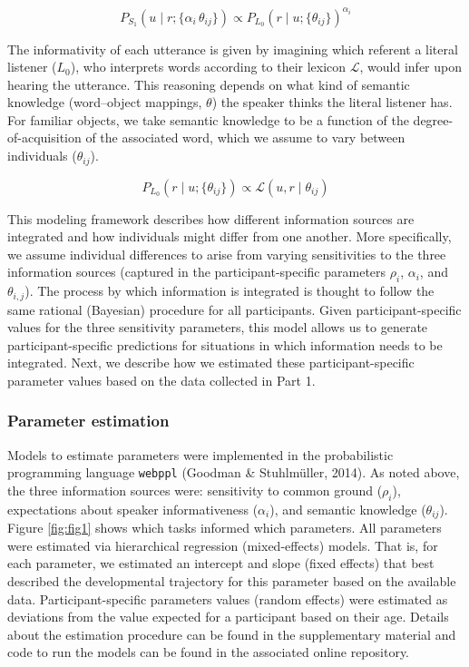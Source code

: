\documentclass[
  man,floatsintext]{apa6}
\begin{document}
\begin{equation}
P_{S_1}(u \mid r; \{\alpha_i\, \theta_{ij}\})\propto P_{L_0}(r \mid u; \{\theta_{ij}\}) ^{\alpha_i}
\label{eq:rsafull2}
\end{equation}

The informativity of each utterance is given by imagining which referent a literal listener (\(L_0\)), who interprets words according to their lexicon \(\mathcal{L}\), would infer upon hearing the utterance. This reasoning depends on what kind of semantic knowledge (word--object mappings, \(\theta\)) the speaker thinks the literal listener has. For familiar objects, we take semantic knowledge to be a function of the degree-of-acquisition of the associated word, which we assume to vary between individuals (\(\theta_{ij}\)).

\begin{equation}
P_{L_0}(r \mid u; \{\theta_{ij}\}) \propto \mathcal{L}(u, r \mid \theta_{ij})
\label{eq:rsafull3}
\end{equation}

This modeling framework describes how different information sources are integrated and how individuals might differ from one another. More specifically, we assume individual differences to arise from varying sensitivities to the three information sources (captured in the participant-specific parameters \(\rho_i\), \(\alpha_i\), and \(\theta_{i,j}\)). The process by which information is integrated is thought to follow the same rational (Bayesian) procedure for all participants. Given participant-specific values for the three sensitivity parameters, this model allows us to generate participant-specific predictions for situations in which information needs to be integrated. Next, we describe how we estimated these participant-specific parameter values based on the data collected in Part 1.

\hypertarget{parameter-estimation}{%
\subsubsection{Parameter estimation}\label{parameter-estimation}}

Models to estimate parameters were implemented in the probabilistic programming language \texttt{webppl} (Goodman \& Stuhlmüller, 2014). As noted above, the three information sources were: sensitivity to common ground (\(\rho_i\)), expectations about speaker informativeness (\(\alpha_i\)), and semantic knowledge (\(\theta_{ij}\)). Figure \ref{fig:fig1} shows which tasks informed which parameters. All parameters were estimated via hierarchical regression (mixed-effects) models. That is, for each parameter, we estimated an intercept and slope (fixed effects) that best described the developmental trajectory for this parameter based on the available data. Participant-specific parameters values (random effects) were estimated as deviations from the value expected for a participant based on their age. Details about the estimation procedure can be found in the supplementary material and code to run the models can be found in the associated online repository.
\end{document}
